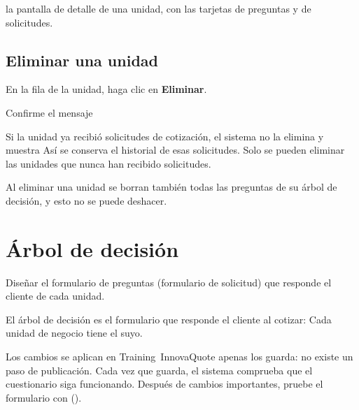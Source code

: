   {la pantalla de detalle de una unidad, con las tarjetas de preguntas y de solicitudes.}

\subsection{Eliminar una unidad}

\begin{pasos}
  \item En la fila de la unidad, haga clic en \icono[error]{\icEliminar} \textbf{Eliminar}.
  \item Confirme el mensaje 
\end{pasos}

Si la unidad ya recibió solicitudes de cotización, el sistema no la elimina y muestra
 Así se conserva el historial de esas solicitudes. Solo se pueden eliminar las
unidades que nunca han recibido solicitudes.

\begin{importante}
Al eliminar una unidad se borran también todas las preguntas de su árbol de decisión, y esto
no se puede deshacer.
\end{importante}

\section{Árbol de decisión}\label{sec:arbol}

  {Diseñar el formulario de preguntas (formulario de solicitud) que responde el cliente de cada
   unidad.}

El árbol de decisión es el formulario que responde el cliente al cotizar:  Cada unidad de negocio tiene
el suyo.

\begin{importante}
Los cambios se aplican en Training~InnovaQuote apenas los guarda: no existe un paso de publicación.
Cada vez que guarda, el sistema comprueba que el cuestionario siga funcionando. Después de
cambios importantes, pruebe el formulario con 
().
\end{importante}

